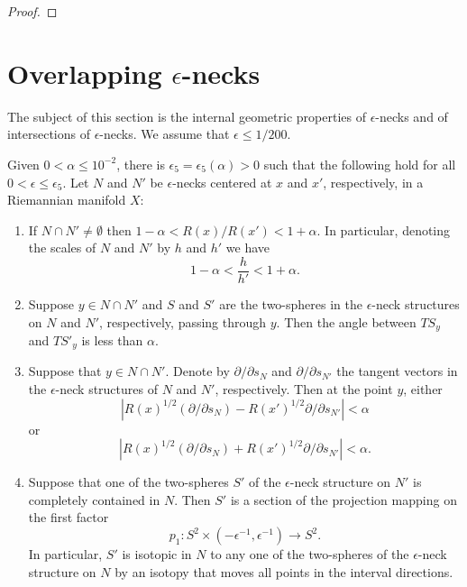 \begin{proof}
\sketch
{}
\end{proof}






\section{Overlapping $\epsilon$-necks}

The subject of this section is the internal geometric properties of
$\epsilon$-necks and of intersections of $\epsilon$-necks. We assume that
$\epsilon\le 1/200$.


\begin{proposition}
\label{prop:overlapping-necks-properties}
\label{S2intersection}
Given $0<\alpha\le 10^{-2}$, there is
$\epsilon_5=\epsilon_5(\alpha)>0$ such that the following hold for
all $0<\epsilon\le \epsilon_5$. Let $N$ and $N'$ be $\epsilon$-necks
centered at $x$ and $x'$, respectively, in a Riemannian manifold
$X$:
\begin{enumerate}
\item[(1)] If $N\cap N'\not=\emptyset$ then
$1-\alpha<R(x)/R(x')<1+\alpha$. In particular, denoting the scales
of $N$ and $N'$ by $h$ and $h'$ we have
$$1-\alpha<\frac{h}{h'}<1+\alpha.$$
\item[(2)] Suppose $y\in N\cap N'$ and $S$ and $S'$ are the two-spheres in the $\epsilon$-neck
structures on $N$ and $N'$, respectively, passing through $y$. Then
the angle between $TS_y$ and $TS'_y$ is less than $\alpha$.
\item[(3)] Suppose that $y\in N\cap N'$. Denote by $\partial/\partial s_N$ and $\partial/\partial s_{N'}$
the tangent vectors in the $\epsilon$-neck structures of $N$ and
$N'$, respectively. Then at the point $y$, either
$$|R(x)^{1/2}(\partial /\partial s_N)-R(x')^{1/2}\partial/\partial s_{N'}|<\alpha$$
or
$$|R(x)^{1/2}(\partial /\partial s_N)+R(x')^{1/2}\partial/\partial s_{N'}|<\alpha.$$
 \item[(4)] Suppose that
one of the two-spheres $S'$ of the $\epsilon$-neck structure on $N'$
is completely contained in $N$. Then $S'$ is a section of the
projection mapping on the first factor
$$p_1\colon S^2\times(-\epsilon^{-1},\epsilon^{-1})\to S^2.$$
In particular, $S'$ is isotopic in $N$ to any one of the two-spheres
of the $\epsilon$-neck structure on $N$ by an isotopy that moves all
points in the interval directions.

\end{enumerate}
\end{proposition}
